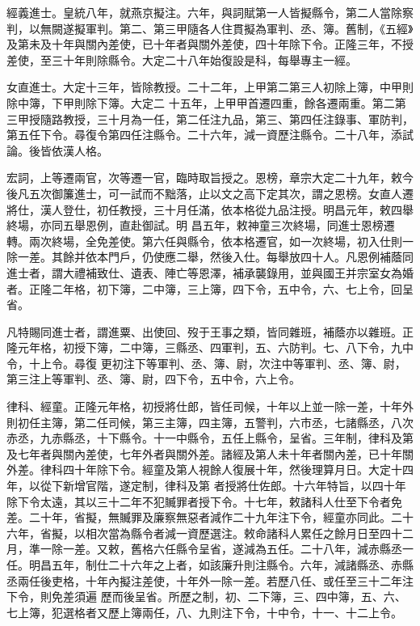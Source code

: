 \begin{pinyinscope}
 經義進士。皇統八年，就燕京擬注。六年，與詞賦第一人皆擬縣令，第二人當除察判，以無闕遂擬軍判。第二、第三甲隨各人住貫擬為軍判、丞、簿。舊制，《五經》及第未及十年與關內差使，已十年者與關外差使，四十年除下令。正隆三年，不授差使，至三十年則除縣令。大定二十八年始復設是科，每舉專主一經。



 女直進士。大定十三年，皆除教授。二十二年，上甲第二第三人初除上簿，中甲則除中簿，下甲則除下簿。大定二
 十五年，上甲甲首遷四重，餘各遷兩重。第二第三甲授隨路教授，三十月為一任，第二任注九品，第三、第四任注錄事、軍防判，第五任下令。尋復令第四任注縣令。二十六年，減一資歷注縣令。二十八年，添試論。後皆依漢人格。



 宏詞，上等遷兩官，次等遷一官，臨時取旨授之。恩榜，章宗大定二十九年，敕今後凡五次御簾進士，可一試而不黜落，止以文之高下定其次，謂之恩榜。女直人遷將仕，漢人登仕，初任教授，三十月任滿，依本格從九品注授。明昌元年，敕四舉終場，亦同五舉恩例，直赴御試。明
 昌五年，敕神童三次終場，同進士恩榜遷轉。兩次終場，全免差使。第六任與縣令，依本格遷官，如一次終場，初入仕則一除一差。其餘并依本門戶，仍使應二舉，然後入仕。每舉放四十人。凡恩例補蔭同進士者，謂大禮補致仕、遺表、陣亡等恩澤，補承襲錄用，並與國王并宗室女為婚者。正隆二年格，初下簿，二中簿，三上簿，四下令，五中令，六、七上令，回呈省。



 凡特賜同進士者，謂進粟、出使回、歿于王事之類，皆同雜班，補蔭亦以雜班。正隆元年格，初授下簿，二中簿，三縣丞、四軍判，五、六防判。七、八下令，九中令，十上令。尋復
 更初注下等軍判、丞、簿、尉，次注中等軍判、丞、簿、尉，第三注上等軍判、丞、簿、尉，四下令，五中令，六上令。



 律科、經童。正隆元年格，初授將仕郎，皆任司候，十年以上並一除一差，十年外則初任主簿，第二任司候，第三主簿，四主簿，五警判，六市丞，七諸縣丞，八次赤丞，九赤縣丞，十下縣令。十一中縣令，五任上縣令，呈省。三年制，律科及第及七年者與關內差使，七年外者與關外差。諸經及第人未十年者關內差，已十年關外差。律科四十年除下令。經童及第人視餘人復展十年，然後理算月日。大定十四年，以從下新增官階，遂定制，律科及第
 者授將仕佐郎。十六年特旨，以四十年除下令太遠，其以三十二年不犯贓罪者授下令。十七年，敕諸科人仕至下令者免差。二十年，省擬，無贓罪及廉察無惡者減作二十九年注下令，經童亦同此。二十六年，省擬，以相次當為縣令者減一資歷選注。敕命諸科人累任之餘月日至四十二月，準一除一差。又敕，舊格六任縣令呈省，遂減為五任。二十八年，減赤縣丞一任。明昌五年，制仕二十六年之上者，如該廉升則注縣令。六年，減諸縣丞、赤縣丞兩任後吏格，十年內擬注差使，十年外一除一差。若歷八任、或任至三十二年注下令，則免差須遍
 歷而後呈省。所歷之制，初、二下簿，三、四中簿，五、六、七上簿，犯選格者又歷上簿兩任，八、九則注下令，十中令，十一、十二上令。




\end{pinyinscope}
